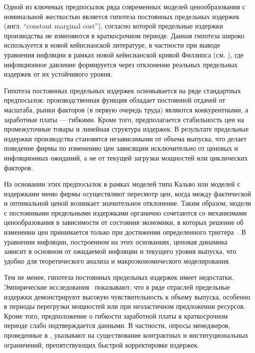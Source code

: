 Одной из ключевых предпосылок ряда современных моделей ценообразования с номинальной жесткостью является гипотеза постоянных предельных издержек (англ. ``constant marginal cost''), согласно которой предельные издержки производства не изменяются в краткосрочном периоде. Данная гипотеза широко используется в новой кейнсианской литературе, в частности при выводе уравнения инфляции в рамках новой кейнсианской кривой Филлипса (см. \cite{Gali2015}), где инфляционное давление формируется через отклонение реальных предельных издержек от их устойчивого уровня.

Гипотеза постоянных предельных издержек основывается на ряде стандартных предпосылок: производственная функция обладает постоянной отдачей от масштаба, рынки факторов (в первую очередь труда) являются конкурентными, а заработные платы — гибкими. Кроме того, предполагается стабильность цен на промежуточные товары и линейная структура издержек. В результате предельные издержки производства становятся независимыми от объема выпуска, что делает поведение фирмы по изменению цен зависящим исключительно от ценовых и инфляционных ожиданий, а не от текущей загрузки мощностей или циклических факторов.

На основании этих предпосылок в рамках моделей типа Кальво или моделей с издержками меню фирмы осуществляют пересмотр цен, когда между фактической и оптимальной ценой возникает значительное отклонение. Таким образом, модели с постоянными предельными издержками органично сочетаются со механизмами ценообразования в зависимости от состояния экономики, в которых решение об изменении цен принимается только при достижении определенного триггера~\cite{Dotsey1999}. В уравнении инфляции, построенном на этих основаниях, ценовая динамика зависит в основном от ожидаемой инфляции и текущего уровня выпуска, что удобно для теоретического анализа и макроэкономического моделирования.

Тем не менее, гипотеза постоянных предельных издержек имеет недостатки. Эмпирические исследования~\cite{RotembergWoodford1999, EichenbaumEtAl2011} показывают, что в ряде отраслей предельные издержки демонстрируют высокую чувствительность к объему выпуска, особенно в периоды перегрузки мощностей или при неэластичном предложении ресурсов. Кроме того, предположение о гибкости заработной платы в краткосрочном периоде слабо подтверждается данными. В частности, опросы менеджеров, проведенные в \cite{BlinderEtAl1998}, указывают на существование контрактных и институциональных ограничений, препятствующих быстрой корректировке издержек.

